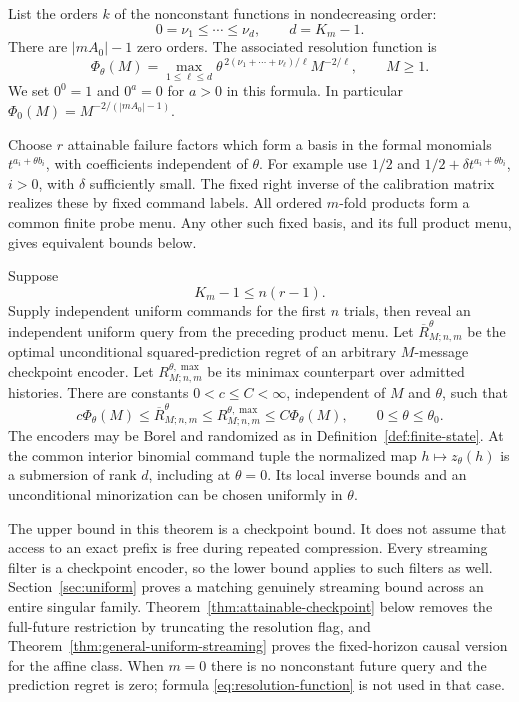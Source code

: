 List the orders $k$ of the nonconstant functions in nondecreasing order:
\[
 0=\nu_1\le\cdots\le\nu_d,\qquad d=K_m-1.
\]
There are $|mA_0|-1$ zero orders. The associated resolution function is
\begin{equation}\label{eq:resolution-function}
 \Phi_\theta(M)=\max_{1\le\ell\le d}
       \theta^{\,2(\nu_1+\cdots+\nu_\ell)/\ell}M^{-2/\ell},
       \qquad M\ge1.
\end{equation}
We set $0^0=1$ and $0^a=0$ for $a>0$ in this formula. In particular
$\Phi_0(M)=M^{-2/(|mA_0|-1)}$.

Choose $r$ attainable failure factors which form a basis in the formal
monomials $t^{a_i+\theta b_i}$, with coefficients independent of $\theta$.
For example use $1/2$ and $1/2+\delta t^{a_i+\theta b_i}$, $i>0$,
with $\delta$ sufficiently small. The fixed right inverse of the
calibration matrix realizes these by fixed command labels. All ordered
$m$-fold products form a common finite probe menu. Any other such fixed
basis, and its full product menu, gives equivalent bounds below.

\begin{theorem}\label{thm:confluent-law}
Suppose
\begin{equation}\label{eq:full-future-condition}
 K_m-1\le n(r-1).
\end{equation}
Supply independent uniform commands for the first $n$ trials, then reveal
an independent uniform query from the preceding product menu. Let
$\overline R_{M;n,m}^\theta$ be the optimal unconditional squared-prediction
regret of an arbitrary $M$-message checkpoint encoder. Let
$R_{M;n,m}^{\theta,\max}$ be its minimax counterpart over admitted histories.
There are constants $0<c\le C<\infty$, independent of $M$ and $\theta$,
such that
\begin{equation}\label{eq:confluent-law}
 c\Phi_\theta(M)\le\overline R_{M;n,m}^\theta
       \le R_{M;n,m}^{\theta,\max}\le C\Phi_\theta(M),
 \qquad 0\le\theta\le\theta_0.
\end{equation}
The encoders may be Borel and randomized as in
Definition~\ref{def:finite-state}. At the common interior binomial command
tuple the normalized map $h\mapsto z_\theta(h)$ is a submersion of rank
$d$, including at $\theta=0$. Its local inverse bounds and an unconditional
minorization can be chosen uniformly in $\theta$.
\end{theorem}

The upper bound in this theorem is a checkpoint bound. It does not assume
that access to an exact prefix is free during repeated compression. Every
streaming filter is a checkpoint encoder, so the lower bound applies to
such filters as well. Section~\ref{sec:uniform} proves a matching genuinely
streaming bound across an entire singular family. Theorem~\ref{thm:attainable-checkpoint}
below removes the full-future restriction by truncating the resolution flag,
and Theorem~\ref{thm:general-uniform-streaming} proves the fixed-horizon
causal version for the affine class. When $m=0$ there is no nonconstant
future query and the prediction regret is zero; formula
\eqref{eq:resolution-function} is not used in that case.

